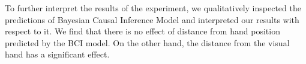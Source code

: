 To further interpret the results of the experiment, we qualitatively inspected the predictions of Bayesian Causal Inference Model and interpreted our results with respect to it. We find that there is no effect of distance from hand position predicted by the BCI model. On the other hand, the distance from the visual hand has a significant effect. 




































